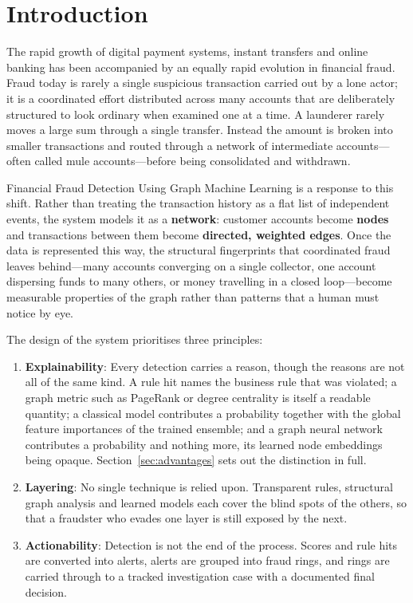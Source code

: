 \chapter{Introduction}

The rapid growth of digital payment systems, instant transfers and online banking has been accompanied by an equally rapid evolution in financial fraud. Fraud today is rarely a single suspicious transaction carried out by a lone actor; it is a coordinated effort distributed across many accounts that are deliberately structured to look ordinary when examined one at a time. A launderer rarely moves a large sum through a single transfer. Instead the amount is broken into smaller transactions and routed through a network of intermediate accounts---often called mule accounts---before being consolidated and withdrawn.

Financial Fraud Detection Using Graph Machine Learning is a response to this shift. Rather than treating the transaction history as a flat list of independent events, the system models it as a \textbf{network}: customer accounts become \textbf{nodes} and transactions between them become \textbf{directed, weighted edges}. Once the data is represented this way, the structural fingerprints that coordinated fraud leaves behind---many accounts converging on a single collector, one account dispersing funds to many others, or money travelling in a closed loop---become measurable properties of the graph rather than patterns that a human must notice by eye.

The design of the system prioritises three principles:

\begin{enumerate}
  \item \textbf{Explainability}: Every detection carries a reason, though the reasons are not all of the same kind. A rule hit names the business rule that was violated; a graph metric such as PageRank or degree centrality is itself a readable quantity; a classical model contributes a probability together with the global feature importances of the trained ensemble; and a graph neural network contributes a probability and nothing more, its learned node embeddings being opaque. Section~\ref{sec:advantages} sets out the distinction in full.
  \item \textbf{Layering}: No single technique is relied upon. Transparent rules, structural graph analysis and learned models each cover the blind spots of the others, so that a fraudster who evades one layer is still exposed by the next.
  \item \textbf{Actionability}: Detection is not the end of the process. Scores and rule hits are converted into alerts, alerts are grouped into fraud rings, and rings are carried through to a tracked investigation case with a documented final decision.
\end{enumerate}

